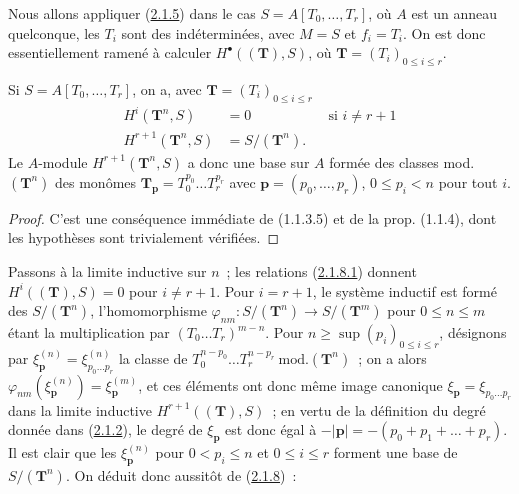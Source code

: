\begin{env}[2.1.7]
\label{III.2.1.7-fr}
Nous allons appliquer (\hyperref[III.2.1.5-fr]{2.1.5}) dans le cas
$S=A[T_0,\ldots,T_r]$, où $A$ est un anneau quelconque, les $T_i$ sont des
indéterminées, avec $M=S$ et $f_i=T_i$. On est donc essentiellement ramené
à calculer $H^\bullet((\mathbf T),S)$, où
$\mathbf T=(T_i)_{0\leq i\leq r}$.
\end{env}

\begin{lemma}[2.1.8]
\label{III.2.1.8-fr}
Si $S=A[T_0,\ldots,T_r]$, on a, avec
$\mathbf T=(T_i)_{0\leq i\leq r}$
\begin{align}
\label{III.2.1.8.1-fr}
\tag{2.1.8.1}
H^i(\mathbf T^n,S)&=0 &&\text{si }i\neq r+1\\
\label{III.2.1.8.2-fr}
\tag{2.1.8.2}
H^{r+1}(\mathbf T^n,S)&=S/(\mathbf T^n).
\end{align}
Le $A$-module $H^{r+1}(\mathbf T^n,S)$ a donc une base sur $A$ formée des
classes mod. $(\mathbf T^n)$ des monômes
$\mathbf T_{\mathbf p}=T_0^{p_0}\ldots T_r^{p_r}$ avec
$\mathbf p=(p_0,\ldots,p_r)$, $0\leq p_i<n$ pour tout $i$.
\end{lemma}

\begin{proof}
C'est une conséquence immédiate de (1.1.3.5) et de la prop. (1.1.4), dont
les hypothèses sont trivialement vérifiées.
\end{proof}

\begin{env}[2.1.9]
\label{III.2.1.9-fr}
Passons à la limite inductive sur $n$~; les relations
(\hyperref[III.2.1.8.1-fr]{2.1.8.1}) donnent
$H^i((\mathbf T),S)=0$ pour $i\neq r+1$. Pour $i=r+1$, le système inductif
est formé des $S/(\mathbf T^n)$, l'homomorphisme
$\varphi_{nm}:S/(\mathbf T^n)\longrightarrow S/(\mathbf T^m)$
pour $0\leq n\leq m$
étant la multiplication par $(T_0\ldots T_r)^{m-n}$. Pour
$n\geq\sup(p_i)_{0\leq i\leq r}$, désignons par
$\xi_{\mathbf p}^{(n)}=\xi_{p_0\ldots p_r}^{(n)}$ la classe de
$T_0^{n-p_0}\ldots T_r^{n-p_r}\ \mathrm{mod.}(\mathbf T^n)$~; on a alors
$\varphi_{nm}(\xi_{\mathbf p}^{(n)})=\xi_{\mathbf p}^{(m)}$, et ces éléments
ont donc même image canonique
$\xi_{\mathbf p}=\xi_{p_0\ldots p_r}$ dans la limite inductive
$H^{r+1}((\mathbf T),S)$~; en vertu de la définition du degré donnée dans
(\hyperref[III.2.1.2-fr]{2.1.2}), le degré de $\xi_{\mathbf p}$ est donc
égal à $-|\mathbf p|=-(p_0+p_1+\ldots+p_r)$. Il est clair que les
$\xi_{\mathbf p}^{(n)}$ pour $0<p_i\leq n$ et $0\leq i\leq r$ forment une
base de $S/(\mathbf T^n)$. On déduit donc aussitôt de
(\hyperref[III.2.1.8-fr]{2.1.8})~:
\end{env}

